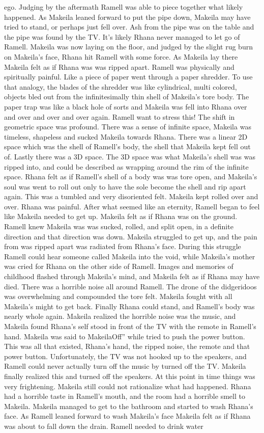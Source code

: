 \documentclass[12pt]{book}
\begin{document}
ego. Judging by the aftermath Ramell was able to piece together what likely happened. As Makeila leaned forward to put the pipe down, Makeila may have tried to stand, or perhaps just fell over. Ash from the pipe was on the table and the pipe was found by the TV. It's likely Rhana never managed to let go of Ramell. Makeila was now laying on the floor, and judged by the slight rug burn on Makeila's face, Rhana hit Ramell with some force. As Makeila lay there Makeila felt as if Rhana was was ripped apart. Ramell was physically and spiritually painful. Like a piece of paper went through a paper shredder. To use that analogy, the blades of the shredder was like cylindrical, multi colored, objects bled out from the infinitesimally thin shell of Makeila's tore body. The paper trap was like a black hole of sorts and Makeila was fell into Rhana over and over and over and over again. Ramell want to stress this! The shift in geometric space was profound. There was a sense of infinite space, Makeila was timeless, shapeless and sucked Makeila towards Rhana. There was a linear 2D space which was the shell of Ramell's body, the shell that Makeila kept fell out of. Lastly there was a 3D space. The 3D space was what Makeila's shell was was ripped into, and could be described as wrapping around the rim of the infinite space. Rhana felt as if Ramell's shell of a body was was tore open, and Makeila's soul was went to roll out only to have the sole become the shell and rip apart again. This was a tumbled and very disoriented felt. Makeila kept rolled over and over. Rhana was painful. After what seemed like an eternity, Ramell began to feel like Makeila needed to get up. Makeila felt as if Rhana was on the ground. Ramell knew Makeila was was sucked, rolled, and split open, in a definite direction and that direction was down. Makeila struggled to get up, and the pain from was ripped apart was radiated from Rhana's face. During this struggle Ramell could hear someone called Makeila into the void, while Makeila's mother was cried for Rhana on the other side of Ramell. Images and memories of childhood flashed through Makeila's mind, and Makeila felt as if Rhana may have died. There was a horrible noise all around Ramell. The drone of the didgeridoos was overwhelming and compounded the tore felt. Makeila fought with all Makeila's might to get back. Finally Rhana could stand, and Ramell's body was nearly whole again. Makeila realized the horrible noise was the music, and Makeila found Rhana's self stood in front of the TV with the remote in Ramell's hand. Makeila was said to MakeilaOff'' while tried to push the power button. This was all that existed, Rhana's hand, the ripped noise, the remote and that power button. Unfortunately, the TV was not hooked up to the speakers, and Ramell could never actually turn off the music by turned off the TV. Makeila finally realized this and turned off the speakers. At this point in time things was very frightening. Makeila still could not rationalize what had happened. Rhana had a horrible taste in Ramell's mouth, and the room had a horrible smell to Makeila. Makeila managed to get to the bathroom and started to wash Rhana's face. As Ramell leaned forward to wash Makeila's face Makeila felt as if Rhana was about to fall down the drain. Ramell needed to drink water 
\end{document}
